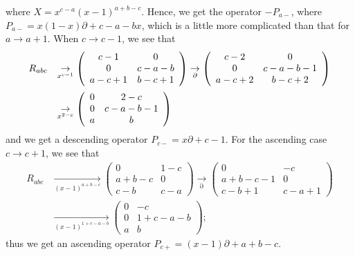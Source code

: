 \documentclass[a4paper,12pt]{article}
\theoremstyle{definition}
\theoremstyle{remark}
\numberwithin{equation}{section} %
\begin{document}
where $X=x^{c-a}(x-1)^{a+b-c}$. Hence, we get the operator $-P_{a-}$,
where $P_{a-}=x(1-x)\partial+c-a-bx$,
which is a little more complicated than that for $a\to a+1$.
When $c\to c-1$, we see that
\[ \begin{array}{ll}
R_{abc} &\underset{x^{c-1}}{\to}
\left( \begin{array}{cc}
c-1&0\\
0&c-a-b\\
a-c+1&b-c+1\end{array}\right)\underset{\partial}{\to}
\left( \begin{array}{cc}
c-2&0\\
0&c-a-b-1\\
a-c+2&b-c+2\end{array}\right)\\  \noalign{\medskip}
&\underset{x^{2-c}}{\to}
\left( \begin{array}{cc}
0&2-c\\
0&c-a-b-1\\
a&b\end{array}\right)
\end{array} \]
and we get a descending operator $P_{c-}=x\partial+c-1$. 
For the ascending case $c\to c+1$, we see that
\[  \begin{array}{ll}
  R_{abc}&  \underset{(x-1)^{a+b-c}}{\to}
\left( \begin{array}{cc}
0&1-c\\
a+b-c&0\\
c-b&c-a\end{array}\right)\underset{\partial}{\to}
\left( \begin{array}{cc}
0&-c\\
a+b-c-1&0\\
c-b+1&c-a+1\end{array}\right)\\
&  \underset{(x-1)^{1+c-a-b}}{\to}
\left( \begin{array}{cc}
0&-c\\
0&1+c-a-b\\
a&b\end{array}\right);
\end{array}\]
thus we get an ascending operator $P_{c+}=(x-1)\partial+a+b-c$.
\end{document}
